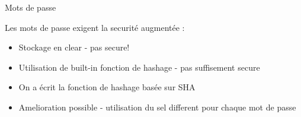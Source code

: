 \begin{frame}{Mots de passe}

  Les mots de passe exigent la securité augmentée : 
  \begin{itemize}
  \item Stockage en clear - pas secure!
  \item Utilisation de built-in fonction de hashage - pas suffisement secure
  \item On a écrit la fonction de hashage basée sur SHA
  \item Amelioration possible - utilisation du sel different pour chaque mot de passe
  \end{itemize}
\end{frame}